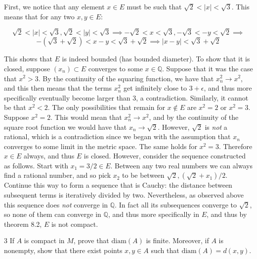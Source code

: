 \begin{solution}
    
    First, we notice that any element $x \in E$ must be such that $\sqrt{2} < \lvert x \rvert < \sqrt{3}$.
    This means that for any two $x, y \in E$:

    \[\sqrt{2} < \lvert x \rvert < \sqrt{3}, \sqrt{2} < \lvert y \rvert < \sqrt{3} \implies -\sqrt{2} < x < \sqrt{3}, -\sqrt{3} < -y < \sqrt{2} \implies \]
    \[ -(\sqrt{3} + \sqrt{2}) < x - y < \sqrt{3} + \sqrt{2} \implies \lvert x - y \rvert < \sqrt{3} + \sqrt{2}\]

    This shows that $E$ is indeed bounded (has bounded diameter).
    To show that it is closed, suppose $(x_n) \subset E$ converges to some $x \in \mathbb{Q}$.
    Suppose that it was the case that $x^2 > 3$.
    By the continuity of the squaring function, we have that $x_n^2 \rightarrow x^2$, and this then means that the terms $x_n^2$ get infinitely close to $3 + \epsilon$, and thus more specifically eventually become larger than 3, a contradiction.
    Similarly, it cannot be that $x^2 < 2$.
    The only possibilities that remain for $x \notin E$ are $x^2 = 2$ or $x^2 = 3$.
    Suppose $x^2 = 2$.
    This would mean that $x_n^2 \rightarrow x^2$, and by the continuity of the square root function we would have that $x_n \rightarrow \sqrt{2}$.
    However, $\sqrt{2}$ is \textit{not} a rational, which is a contradiction since we began with the assumption that $x_n$ converges to some limit in the metric space.
    The same holds for $x^2 = 3$.
    Therefore $x \in E$ always, and thus $E$ is closed.
    However, consider the sequence constructed as follows.
    Start with $x_1 = 3/2 \in E$. 
    Between any two real numbers we can always find a rational number, and so pick $x_2$ to be between $\sqrt{2}, (\sqrt{2} + x_1)/2$.
    Continue this way to form a sequence that is Cauchy: the distance between subsequent terms is iteratively divided by two.
    Nevertheless, as observed above this sequence does \textit{not} converge in $\mathbb{Q}$.
    In fact all its subsequences converge to $\sqrt{2}$, so none of them can converge in $\mathbb{Q}$, and thus more specifically in $E$, and thus by theorem 8.2, $E$ is not compact.
\end{solution}

\newpage

\begin{exercise}{3}
    If $A$ is compact in $M$, prove that $\text{diam}(A)$ is finite.
    Moreover, if $A$ is nonempty, show that there exist points $x, y \in A$ such that $\text{diam}(A) = d(x, y)$.
\end{exercise}

